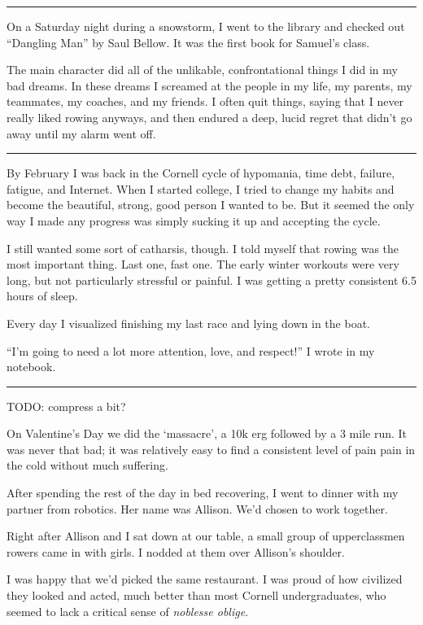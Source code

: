 \plainfancybreak{12pt}{2}{* * *}

On a Saturday night during a snowstorm, I went to the library and checked out
``Dangling Man'' by Saul Bellow.  It was the first book for Samuel's class.

The main character did all of the unlikable, confrontational things I did in my
bad dreams.  In these dreams I screamed at the people in my life, my parents, my
teammates, my coaches, and my friends.  I often quit things, saying that I never
really liked rowing anyways, and then endured a deep, lucid regret that didn't
go away until my alarm went off.

\plainfancybreak{12pt}{2}{* * *}

By February I was back in the Cornell cycle of hypomania, time debt, failure,
fatigue, and Internet.  When I started college, I tried to change my habits and
become the beautiful, strong, good person I wanted to be.  But it seemed the
only way I made any progress was simply sucking it up and accepting the cycle.

I still wanted some sort of catharsis, though.  I told myself that rowing was
the most important thing.  Last one, fast one.  The early winter workouts were
very long, but not particularly stressful or painful.  I was getting a pretty
consistent 6.5 hours of sleep.

Every day I visualized finishing my last race and lying down in the boat.

``I'm going to need a lot more attention, love, and respect!'' I wrote in my
notebook. 

\plainfancybreak{12pt}{2}{* * *}

TODO: compress a bit?

On Valentine's Day we did the `massacre', a 10k erg followed by a 3 mile run.
It was never that bad; it was relatively easy to find a consistent level of pain
pain in the cold without much suffering.  

After spending the rest of the day in bed recovering, I went to dinner with my
partner from robotics.  Her name was Allison.  We'd chosen to work together.  

Right after Allison and I sat down at our table, a small group of upperclassmen
rowers came in with girls.  I nodded at them over Allison's shoulder.  

I was happy that we'd picked the same restaurant.  I was proud of how civilized
they looked and acted, much better than most Cornell undergraduates, who seemed
to lack a critical sense of \textit{noblesse oblige}.

